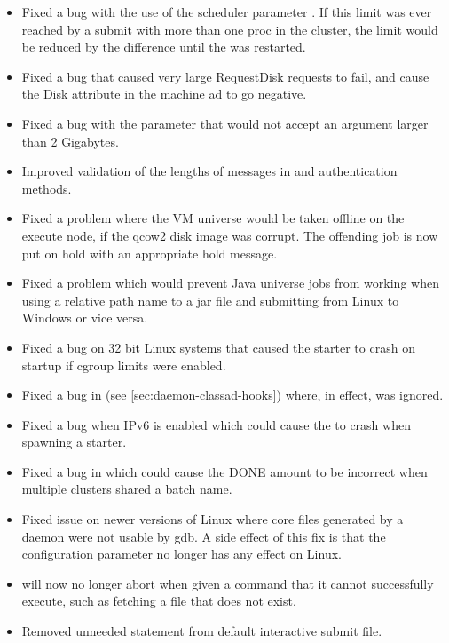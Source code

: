 \begin{itemize}
\item Fixed a bug with the use of the scheduler parameter
. If this limit was ever reached by a
submit with more than one proc in the cluster, the limit would be
reduced by the difference until the  was restarted.

\item Fixed a bug that caused very large RequestDisk requests
to fail, and cause the Disk attribute in the machine ad to go
negative.

\item Fixed a bug with the  parameter that would not
accept an argument larger than 2 Gigabytes.

\item Improved validation of the lengths of messages in 
and  authentication methods.

\item Fixed a problem where the VM universe would be taken offline
on the execute node, if the qcow2 disk image was corrupt.
The offending job is now put on hold with an appropriate hold message.

\item Fixed a problem which would prevent Java universe jobs from working
when using a relative path name to a jar file and submitting from Linux to
Windows or vice versa.

\item Fixed a bug on 32 bit Linux systems that caused the starter to crash
on startup if cgroup limits were enabled.

\item Fixed a bug in  (see \ref{sec:daemon-classad-hooks})
where, in effect,  was ignored.

\item Fixed a bug when IPv6 is enabled which could cause the
 to crash when spawning a starter.

\item Fixed a bug in  which could cause the DONE amount to be
incorrect when multiple clusters shared a batch name.

\item Fixed issue on newer versions of Linux where core files generated
by a daemon were not usable by gdb.
A side effect of this fix is that the configuration parameter
 no longer has any effect on Linux.

\item {} will now no longer abort when given a command that it
cannot successfully execute, such as fetching a file that does not exist.

\item Removed unneeded  statement from default
interactive submit file.

\end{itemize}

